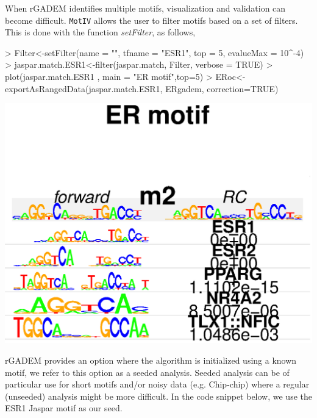 \documentclass[12pt]{article}
\newcommand{\Rfunction}[1]{{\textit{#1}}}
\newcommand{\Rpackage}[1]{\texttt{#1}}
\begin{document}
When rGADEM identifies multiple motifs, visualization and validation can become difficult. \Rpackage{MotIV} allows the user to filter motifs based on a set of filters. This is done with the function \Rfunction{setFilter}, as follows,
\begin{Schunk}
\begin{Sinput}
> Filter<-setFilter(name = "", tfname = "ESR1", top = 5, evalueMax = 10^-4)
> jaspar.match.ESR1<-filter(jaspar.match, Filter, verbose = TRUE)
> plot(jaspar.match.ESR1 , main = "ER motif",top=5)
> ERoc<-exportAsRangedData(jaspar.match.ESR1, ERgadem, correction=TRUE)
\end{Sinput}
\end{Schunk}
\includegraphics{chipData_AD-Filtering-with-MotIV}

rGADEM provides an option where the algorithm is initialized using a known motif, we refer to this option as a seeded analysis. Seeded analysis can be of particular use for short motifs and/or noisy data (e.g. Chip-chip) where a regular (unseeded) analysis might be more difficult. In the code snippet below, we use the ESR1 Jaspar motif as our seed.
\end{document}
